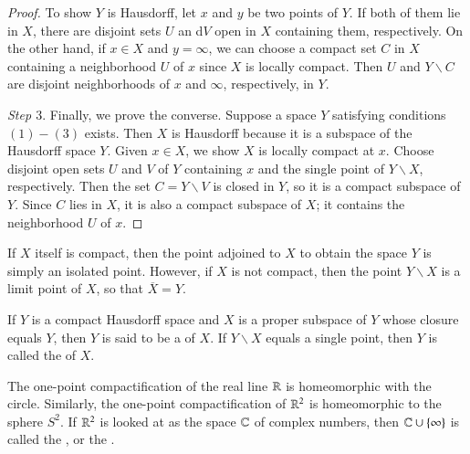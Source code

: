 \documentclass[12pt, a4paper, oneside, openright, titlepage]{book}
\begin{document}
\begin{proof}
    To show $Y$ is Hausdorff, let $x$ and $y$ be two points of $Y$. If both of them lie in $X$, there are disjoint sets $U$ an d$V$ open in $X$ containing them, respectively. On the other hand, if $x \in X$ and $y = \infty$, we can choose a compact set $C$ in $X$ containing a neighborhood $U$ of $x$ since $X$ is locally compact. Then $U$ and $Y\backslash C$ are disjoint neighborhoods of $x$ and $\infty$, respectively, in $Y$.

    \emph{Step $3.$} Finally, we prove the converse. Suppose a space $Y$ satisfying conditions $(1)-(3)$ exists. Then $X$ is Hausdorff because it is a subspace of the Hausdorff space $Y$. Given $x \in X$, we show $X$ is locally compact at $x$. Choose disjoint open sets $U$ and $V$ of $Y$ containing $x$ and the single point of $Y\backslash X$, respectively. Then the set $C = Y\backslash V$ is closed in $Y$, so it is a compact subspace of $Y$. Since $C$ lies in $X$, it is also a compact subspace of $X$; it contains the neighborhood $U$ of $x$.
\end{proof}

If $X$ itself is compact, then the point adjoined to $X$ to obtain the space $Y$ is simply an isolated point. However, if $X$ is not compact, then the point $Y\backslash X$ is a limit point of $X$, so that $\overline{X} = Y$.


\begin{defn}
    If $Y$ is a compact Hausdorff space and $X$ is a proper subspace of $Y$ whose closure equals $Y$, then $Y$ is said to be a  of $X$. If $Y\backslash X$ equals a single point, then $Y$ is called the  of $X$.
\end{defn}

\begin{eg}
    The one-point compactification of the real line $\mathbb R$ is homeomorphic with the circle. Similarly, the one-point compactification of $\mathbb R^2$ is homeomorphic to the sphere $S^2$. If $\mathbb R^2$ is looked at as the space $\mathbb C$ of complex numbers, then $\mathbb C\cup\{\infty\}$ is called the , or the .
\end{eg}
\end{document}
